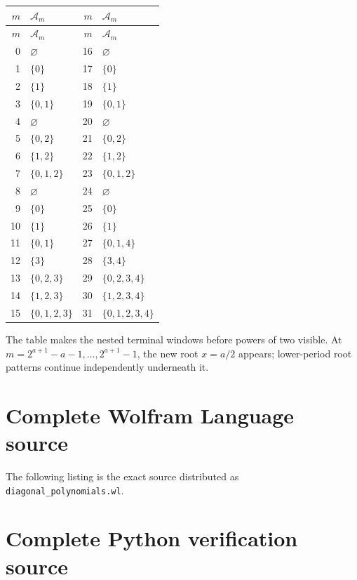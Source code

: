 \documentclass[11pt,oneside]{article}
\theoremstyle{definition}
\theoremstyle{remark}
\begin{document}
\begin{center}
\small
\begin{longtable}{r@{\quad}l|r@{\quad}l}
\toprule
$m$ & $\mathcal A_m$ & $m$ & $\mathcal A_m$\\
\midrule
\endfirsthead
\toprule
$m$ & $\mathcal A_m$ & $m$ & $\mathcal A_m$\\
\midrule
\endhead
0&$\varnothing$&16&$\varnothing$\\
1&$\{0\}$&17&$\{0\}$\\
2&$\{1\}$&18&$\{1\}$\\
3&$\{0,1\}$&19&$\{0,1\}$\\
4&$\varnothing$&20&$\varnothing$\\
5&$\{0,2\}$&21&$\{0,2\}$\\
6&$\{1,2\}$&22&$\{1,2\}$\\
7&$\{0,1,2\}$&23&$\{0,1,2\}$\\
8&$\varnothing$&24&$\varnothing$\\
9&$\{0\}$&25&$\{0\}$\\
10&$\{1\}$&26&$\{1\}$\\
11&$\{0,1\}$&27&$\{0,1,4\}$\\
12&$\{3\}$&28&$\{3,4\}$\\
13&$\{0,2,3\}$&29&$\{0,2,3,4\}$\\
14&$\{1,2,3\}$&30&$\{1,2,3,4\}$\\
15&$\{0,1,2,3\}$&31&$\{0,1,2,3,4\}$\\
\bottomrule
\end{longtable}
\end{center}

The table makes the nested terminal windows before powers of two visible.  At
$m=2^{a+1}-a-1,\ldots,2^{a+1}-1$, the new root $x=a/2$ appears; lower-period
root patterns continue independently underneath it.

\section{Complete Wolfram Language source}
\label{app:wolfram}

The following listing is the exact source distributed as
\texttt{diagonal\_polynomials.wl}.



\section{Complete Python verification source}
\label{app:python}
\end{document}
